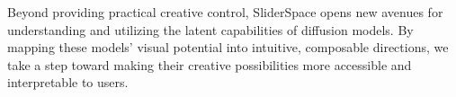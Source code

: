 Beyond providing practical creative control, SliderSpace opens new avenues for understanding and utilizing the latent capabilities of diffusion models. By mapping these models' visual potential into intuitive, composable directions, we take a step toward making their creative possibilities more accessible and interpretable to users.




